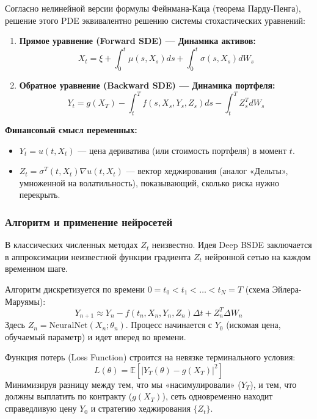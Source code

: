 \documentclass[12pt, a4paper]{article}
\begin{document}
Согласно нелинейной версии формулы Фейнмана-Каца (теорема Парду-Пенга), решение этого PDE эквивалентно решению системы стохастических уравнений:

\begin{enumerate}
    \item \textbf{Прямое уравнение (Forward SDE) — Динамика активов:}
    \begin{equation}
        X_t = \xi + \int_{0}^{t} \mu(s, X_s) ds + \int_{0}^{t} \sigma(s, X_s) dW_s
    \end{equation}
    \item \textbf{Обратное уравнение (Backward SDE) — Динамика портфеля:}
    \begin{equation}
        Y_t = g(X_T) - \int_{t}^{T} f(s, X_s, Y_s, Z_s) ds - \int_{t}^{T} Z_s^T dW_s
    \end{equation}
\end{enumerate}

\textbf{Финансовый смысл переменных:}
\begin{itemize}
    \item $Y_t = u(t, X_t)$ — цена дериватива (или стоимость портфеля) в момент $t$.
    \item $Z_t = \sigma^T(t, X_t) \nabla u(t, X_t)$ — вектор хеджирования (аналог «Дельты», умноженной на волатильность), показывающий, сколько риска нужно перекрыть.
\end{itemize}

\subsubsection{Алгоритм и применение нейросетей}
В классических численных методах $Z_t$ неизвестно. Идея Deep BSDE заключается в аппроксимации неизвестной функции градиента $Z_t$ нейронной сетью на каждом временном шаге.

Алгоритм дискретизуется по времени $0 = t_0 < t_1 < \dots < t_N = T$ (схема Эйлера-Маруямы):
\begin{equation}
    Y_{n+1} \approx Y_n - f(t_n, X_n, Y_n, Z_n)\Delta t + Z_n^T \Delta W_n
\end{equation}
Здесь $Z_n = \text{NeuralNet}(X_n; \theta_n)$.
Процесс начинается с $Y_0$ (искомая цена, обучаемый параметр) и идет вперед во времени.

Функция потерь (Loss Function) строится на невязке терминального условия:
\begin{equation}
    L(\theta) = \mathbb{E} \left[ | Y_T(\theta) - g(X_T) |^2 \right]
\end{equation}
Минимизируя разницу между тем, что мы «насимулировали» ($Y_T$), и тем, что должны выплатить по контракту ($g(X_T)$), сеть одновременно находит справедливую цену $Y_0$ и стратегию хеджирования $\{Z_t\}$.
\end{document}
